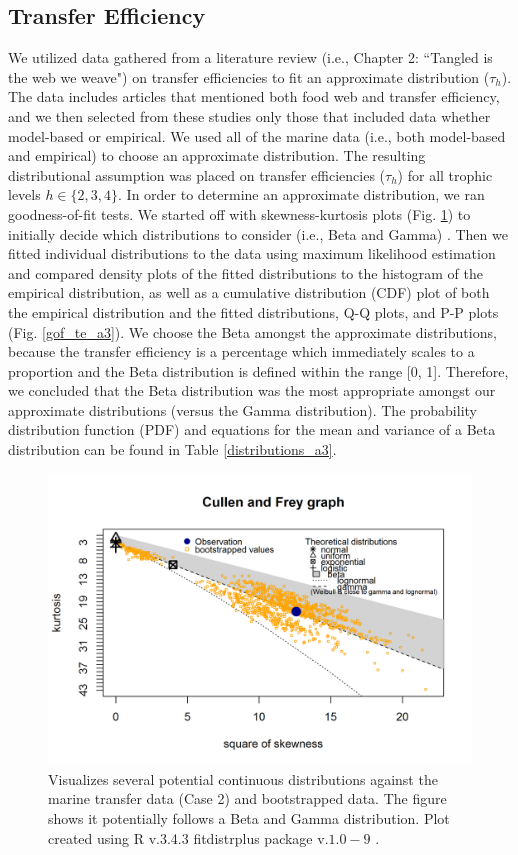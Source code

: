 \documentclass[oneside,12pt,final]{sty/ucthesis-CA2012}
\let\cite\citep                             %
\begin{document}
\begin{mainmatter}
\subsection{Transfer Efficiency}
We utilized data gathered from a literature review (i.e., Chapter 2: ``Tangled is the web we weave") on transfer efficiencies to fit an approximate distribution ($\tau_h$). The data includes articles that mentioned both food web and transfer efficiency, and we then selected from these studies only those that included data whether model-based or empirical. We used all of the marine data (i.e., both model-based and empirical) to choose an approximate distribution. The resulting distributional assumption was placed on transfer efficiencies ($\tau_h$) for all trophic levels $h \in \{2, 3, 4\}$. In order to determine an approximate distribution, we ran goodness-of-fit tests. We started off with skewness-kurtosis plots (Fig. \ref{cf_te_a3}) to initially decide which distributions to consider (i.e., Beta and Gamma) \cite{fitdistrplus}. Then we fitted individual distributions to the data using maximum likelihood estimation and compared density plots of the fitted distributions to the histogram of the empirical distribution,  as well as a cumulative distribution (CDF) plot of both the empirical distribution and the fitted distributions, Q-Q plots, and P-P plots (Fig. \ref{gof_te_a3}). We choose the Beta amongst the approximate distributions, because the transfer efficiency is a percentage which immediately scales to a proportion and the Beta distribution is defined within the range [0, 1]. Therefore, we concluded that the Beta distribution was the most appropriate amongst our approximate distributions (versus the Gamma distribution). The probability distribution function (PDF) and equations for the mean and variance of a Beta distribution can be found in Table \ref{distributions_a3}.

\begin{figure}[H]
     \centering
       \includegraphics[width=.8\textwidth]{fig/cullen_frey_te}
    \caption{Visualizes several potential continuous distributions against the marine transfer data (Case 2) and bootstrapped data. The figure shows it potentially follows a Beta and Gamma distribution. Plot created using R v.3.4.3 \cite{Rcite} fitdistrplus package v.$1.0-9$ \cite{fitdistrplus}. }
    \label{cf_te_a3}
\end{figure}


\end{mainmatter}
\end{document}
